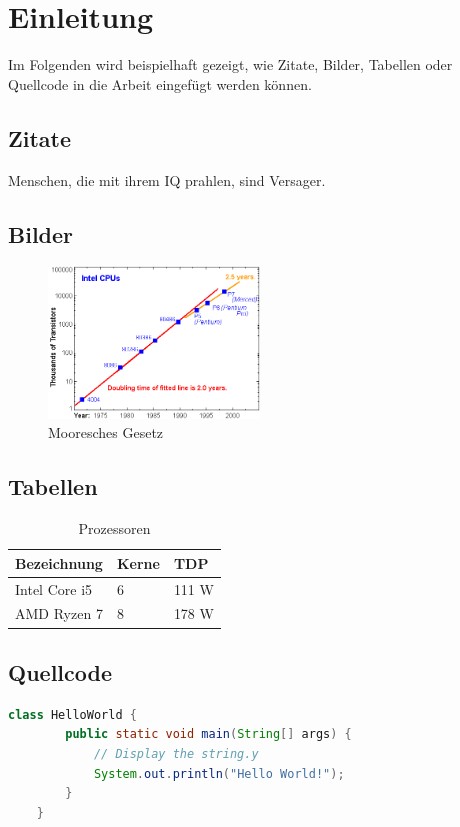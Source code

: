 \section{Einleitung}

Im Folgenden wird beispielhaft gezeigt, wie Zitate, Bilder, Tabellen oder Quellcode in die Arbeit eingefügt werden können.

\subsection{Zitate}
Menschen, die mit ihrem IQ prahlen, sind Versager.

\subsection{Bilder}
\begin{figure}[H] 
    \centering
    \includegraphics[width=0.5\textwidth]{figures/figure_example.png}
    \caption{Mooresches Gesetz}
\end{figure}

\subsection{Tabellen}
\begin{table}[H]
    \centering
    \begin{tabular}[H]{l|l|l}
        Bezeichnung & Kerne & TDP \\
        \hline
        Intel Core i5 & 6 & 111 W \\
        \hline
        AMD Ryzen 7 & 8 & 178 W \\
    \end{tabular}
    \caption{Prozessoren}
\end{table}


\subsection{Quellcode}
\begin{lstlisting}[language=java, caption=Hello World in Java, captionpos=b]
    class HelloWorld {
        public static void main(String[] args) {
            // Display the string.y
            System.out.println("Hello World!");
        }
    }
\end{lstlisting}
